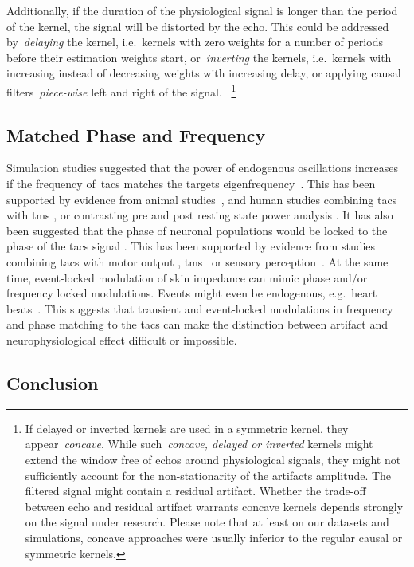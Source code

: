 \documentclass[a4paper]{article}
\begin{document}
Additionally, if the duration of the physiological signal is longer than the period of the kernel, the signal will be distorted by the echo.
This could be addressed by~\emph{delaying} the kernel, i.e.\ kernels with zero weights for a number of periods before their estimation weights start, or~\emph{inverting} the kernels, i.e.\ kernels with increasing instead of decreasing weights with increasing delay, or applying causal filters~\emph{piece-wise} left and right of the signal.
~\footnote{If delayed or inverted kernels are used in a symmetric kernel, they appear~\emph{concave}.
While such~\emph{concave, delayed or inverted} kernels might extend the window free of echos around physiological signals, they might not sufficiently account for the non-stationarity of the artifacts amplitude.
The filtered signal might contain a residual artifact.
Whether the trade-off between echo and residual artifact warrants concave kernels depends strongly on the signal under research.
Please note that at least on our datasets and simulations, concave approaches were usually inferior to the regular  causal or symmetric kernels.}

\subsection{Matched Phase and Frequency}

Simulation studies suggested that the power of endogenous oscillations increases if the frequency of~\gls{tacs} matches the targets eigenfrequency~\citep{Kutchko_2013,Zaehle_2010}.
This has been supported by evidence from animal studies~\citep{Schmidt_2014}, and human studies combining \gls{tacs} with \gls{tms} \citep{Guerra_2016}, or contrasting pre and post resting state power analysis \citep{Zaehle_2010}.
It has also been suggested that the phase of neuronal populations would be locked to the phase of the \gls{tacs} signal \citep{Reato_2013}. This has been supported by evidence from studies combining \gls{tacs} with motor output \citep{Brittain_2013}, \gls{tms}~\citep{Raco_2016,Nakazono_2016} or sensory perception~\citep{Gundlach_2016}.
At the same time, event-locked modulation of skin impedance can mimic phase and/or frequency locked modulations. Events might even be endogenous, e.g.\ heart beats~\citep{Noury_2016}.
This suggests that transient and event-locked modulations in frequency and phase matching to the \gls{tacs} can make the  distinction between artifact and neurophysiological effect difficult or impossible.

\subsection{Conclusion}
\end{document}
